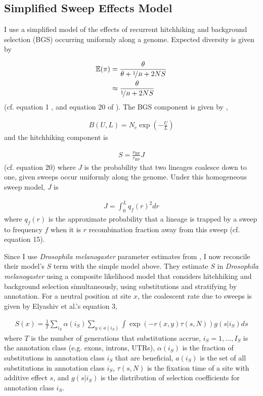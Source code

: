 \documentclass[9pt,lineno]{elife}
\newcommand{\E}{\mathbb{E}}
\begin{document}
\appendix
\begin{appendixbox}
\section{Simplified Sweep Effects Model}
\label{app:sweep}

I use a simplified model of the effects of recurrent hitchhiking and background
selection (BGS) occurring uniformly along a genome. Expected diversity is given
by

\begin{align}
  \E(\pi) &= \frac{\theta}{\theta + \nicefrac{1}{B} + 2NS} \\
          &\approx \frac{\theta}{\nicefrac{1}{B} + 2NS} 
\end{align}
%
(cf. equation 1 \cite{Elyashiv2016-vt}, and equation 20 of \cite{Coop2012-cd}).
The BGS component is given by \cite{Hudson1995-xc},

\begin{align}
  B(U, L) = N_e \exp\left(-\frac{U}{L}\right)
\end{align}
%
and the hitchhiking component is

\begin{align}
  S = \frac{\nu_\text{BP}}{r_\text{BP}} J
\end{align}
%
(cf. \cite{Coop2012-cd} equation 20) where $J$ is the probability that two
lineages coalesce down to one, given sweeps occur uniformly along the genome.
Under this homogeneous sweep model, $J$ is 

\begin{align}
  J = \int_0^L q_f(r)^2 dr 
\end{align}
%
where $q_f(r)$ is the approximate probability that a lineage is trapped by a
sweep to frequency $f$ when it is $r$ recombination fraction away from this
sweep (cf. \cite{Coop2012-cd} equation 15). 

Since I use \emph{Drosophila melanogaster} parameter estimates from
\cite{Elyashiv2016-vt}, I now reconcile their model's $S$ term with the
simple model above. They estimate $S$ in \emph{Drosophila melanogaster} using a
composite likelihood model that considers hitchhiking and background selection
simultaneously, using substitutions and stratifying by annotation.  For a
neutral position at site $x$, the coalescent rate due to sweeps is given by
Elyashiv et al.'s equation 3, 

\begin{align}
  S(x) = \frac{1}{T} \sum_{i_S} \alpha(i_S) \sum_{y \in a(i_S)} \int \exp(-r(x, y) \tau(s, N)) g(s | i_S) ds
\end{align}
%
where $T$ is the number of generations that substitutions accrue, $i_S = 1,
\ldots, I_S$ is the annotation class (e.g. exons, introns, UTRs), $\alpha(i_S)$
is the fraction of substitutions in annotation class $i_S$ that are beneficial,
$a(i_S)$ is the set of all substitutions in annotation class $i_S$, $\tau(s,
N)$ is the fixation time of a site with additive effect $s$, and $g(s | i_S)$
is the distribution of selection coefficients for annotation class $i_S$. 


\end{appendixbox}
\end{document}
